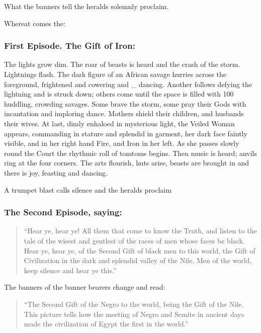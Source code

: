 \documentclass[letterpaper,10pt,english]{jupyterBook}
\begin{document}
\sphinxAtStartPar
What the banners tell the heralds solemnly proclaim.

\sphinxAtStartPar
Whereat comes the:


\subsubsection{First Episode. The Gift of Iron:}
\label{\detokenize{Volumes/06/07/national_emancipation_exposition:first-episode-the-gift-of-iron}}
\sphinxAtStartPar
The lights grow dim. The roar of beasts is heard and the crash of the storm. Lightnings flash. The dark figure of an African savage hurries across the foreground, frightened and cowering and \_ dancing. Another follows defying the lightning and is struck down; others come until the space is filled with 100 huddling, crowding savages. Some brave the storm, some pray their Gods with incantation and imploring dance. Mothers shield their children, and husbands their wives. At last, dimly enhaloed in mysterious light, the Veiled Woman appears, commanding in stature and splendid in garment, her dark face faintly visible, and in her right hand Fire, and Iron in her left. As she passes slowly round the Court the rhythmic roll of tomtoms begins. Then music is heard; anvils ring at the four corners. The arts flourish, huts arise, beasts are brought in and there is joy, feasting and dancing.

\sphinxAtStartPar
A trumpet blast calls silence and the heralds proclaim


\subsubsection{The Second Episode, saying:}
\label{\detokenize{Volumes/06/07/national_emancipation_exposition:the-second-episode-saying}}\begin{quote}

\sphinxAtStartPar
“Hear ye, hear ye! All them that come to know the Truth, and listen to the tale of the wisest and gentlest of the races of men whose faces be black. Hear ye, hear ye, of the Second Gift of black men to this world, the Gift of Civilization in the dark and splendid valley of the Nile. Men of the world, keep silence and hear ye this.”
\end{quote}

\sphinxAtStartPar
The banners of the banner bearers change and read:
\begin{quote}

\sphinxAtStartPar
“The Second Gift of the Negro to the world, being the Gift of the Nile. This picture tells how the meeting of Negro and Semite in ancient days made the civilization of Egypt the first in the world.”
\end{quote}
\end{document}
